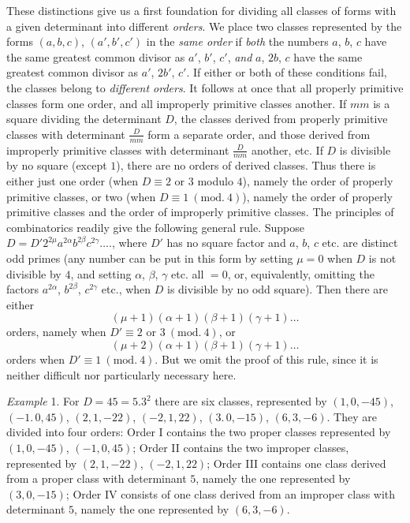 These distinctions give us a first foundation for dividing all classes of forms with a given determinant into different \textit{orders}. We place two classes represented by the forms $(a,b,c)$, $(a',b',c')$ in the \textit{same order} if \textit{both} the numbers $a$, $b$, $c$ have the same greatest common divisor as $a'$, $b'$, $c'$, \textit{and} $a$, $2b$, $c$ have the same greatest common divisor as $a'$, $2b'$, $c'$. If either or both of these conditions fail, the classes belong to \textit{different orders}. It follows at once that all properly primitive classes form one order, and all improperly primitive classes another. If $mm$ is a square dividing the determinant $D$, the classes derived from properly primitive classes with determinant $\frac{D}{mm}$ form a separate order, and those derived from improperly primitive classes with determinant $\frac{D}{mm}$ another, etc. If $D$ is divisible by no square (except $1$), there are no orders of derived classes. Thus there is either just one order (when $D\equiv2$ or $3$ modulo $4$), namely the order of properly primitive classes, or two (when $D\equiv1\ (\mathrm{mod.}\ 4)$), namely the order of properly primitive classes and the order of improperly primitive classes. The principles of combinatorics readily give the following general rule. Suppose $D=D'2^{2\mu}a^{2\alpha}b^{2\beta}c^{2\gamma}\ldots.$, where $D'$ has no square factor and $a$, $b$, $c$ etc. are distinct odd primes (any number can be put in this form by setting $\mu=0$ when $D$ is not divisible by $4$, and setting $\alpha$, $\beta$, $\gamma$ etc. all $=0$, or, equivalently, omitting the factors $a^{2\alpha}$, $b^{2\beta}$, $c^{2\gamma}$ etc., when $D$ is divisible by no odd square). Then there are either
\[
(\mu+1)(\alpha+1)(\beta+1)(\gamma+1)\ldots
\]
orders, namely when $D'\equiv2$ or $3\ (\mathrm{mod.}\ 4)$, or
\[
(\mu+2)(\alpha+1)(\beta+1)(\gamma+1)\ldots
\]
orders when $D'\equiv1\ (\mathrm{mod.}\ 4)$. But we omit the proof of this rule, since it is neither difficult nor particularly necessary here.

\textit{Example} 1. For $D=45=5.3^2$ there are six classes, represented by $(1,0,-45)$, $(-1.\,0,45)$, $(2,1,-22)$, $(-2,1,22)$, $(3.\,0,-15)$, $(6,3,-6)$. They are divided into four orders: Order I contains the two proper classes represented by $(1,0,-45)$, $(-1,0,45)$; Order II contains the two improper classes, represented by $(2,1,-22)$, $(-2,1,22)$; Order III contains one class derived from a proper class with determinant $5$, namely the one represented by $(3,0,-15)$; Order IV consists of one class derived from an improper class with determinant $5$, namely the one represented by $(6,3,-6)$.

